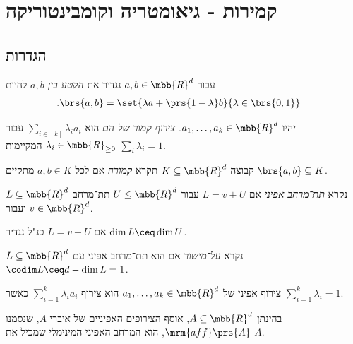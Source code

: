 \documentclass[a4paper,10pt,twoside,openany]{book}
\begin{document}
\chapter{קמירות - גיאומטריה וקומבינטוריקה}

\section{הגדרות}

\begin{definition}
עבור
$a,b \in \mbb{R}^d$
נגדיר את
\emph{הקטע בין
$a,b$}
להיות
\begin{align*}
\text{.} \brs{a,b} &= \set{\lambda a + \prs{1-\lambda} b}{\lambda \in \brs{0,1}}
\end{align*}
\end{definition}

\begin{definition}
יהיו
$a_1, \ldots, a_k \in \mbb{R}^d$.
\emph{צירוף קמור של הם}
הוא
$\sum_{i \in [k]} \lambda_i a_i$
עבור
$\lambda_i \in \mbb{R}_{\geq 0}$
המקיימות
$\sum_i \lambda_i = 1$.
\end{definition}

\begin{definition}
קבוצה
$K \subseteq \mbb{R}^d$
תקרא
\emph{קמורה}
אם לכל
$a,b \in K$
מתקיים
$\brs{a,b} \subseteq K$.
\end{definition}

\begin{definition}
$L \subseteq \mbb{R}^d$
נקרא
\emph{תת־מרחב אפיני}
אם
$L = v + U$
עבור
$U \leq \mbb{R}^d$
תת־מרחב ועבור
$v \in \mbb{R}^d$.
\end{definition}

\begin{definition}
אם
$L = v + U$
כנ"ל נגדיר
$\dim L \ceq \dim U$.
\end{definition}

\begin{definition}[על־מישור]
$L \subseteq \mbb{R}^d$
נקרא
\emph{על־מישור}
אם הוא תת־מרחב אפיני עם
$\codim L \ceq d - \dim L = 1$.
\end{definition}

\begin{definition}
צירוף אפיני של
$a_1, \ldots, a_k \in \mbb{R}^d$
הוא צירוף
$\sum_{i=1}^k \lambda_i a_i$
כאשר
$\sum_{i=1}^k \lambda_i = 1$.
\end{definition}

\begin{exercise}
בהינתן
$A \subseteq \mbb{R}^d$,
אוסף הצירופים האפיניים של איברי
$A$,
שנסמנו
$\mrm{aff}\prs{A}$,
הוא המרחב האפיני המינימלי שמכיל את
$A$.
\end{exercise}
\end{document}
